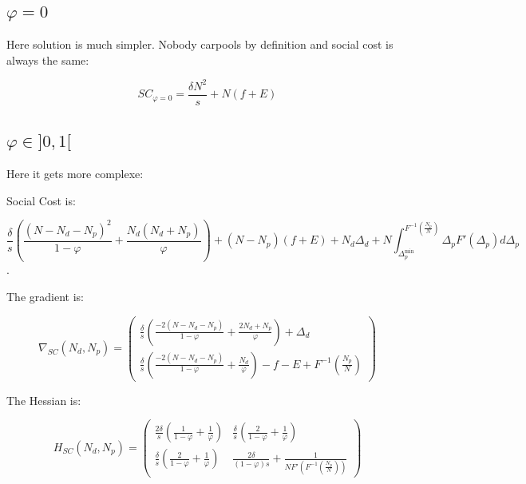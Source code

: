 \documentclass[english, a4paper]{article}
\theoremstyle{plain}
\theoremstyle{definition}
\theoremstyle{remark}
\begin{document}
    \subsection{$\varphi = 0$}

    Here solution is much simpler. Nobody carpools by definition and social cost is always the same:

    \begin{equation}
        SC_{\varphi = 0} = \frac{\delta N^2}{s} + N (f+E)
    \end{equation}

    \subsection{$\varphi \in ]0, 1[$}

    Here it gets more complexe:

    Social Cost is:

    \begin{equation}
        \frac{\delta}{s} \left ( \frac{(N - N_d - N_p)^2}{1- \varphi} + \frac{N_d(N_d + N_p)}{\varphi} \right)
        + (N - N_p) (f+E)
        + N_d \Delta_d + N \int_{\Delta_p^{\text{min}}}^{F^{-1} \left ( \frac{N_p}{N} \right)} \Delta_p F'(\Delta_p) d\Delta_p
    \end{equation}.

    The gradient is:

    \begin{equation}
        \nabla_{SC} (N_d, N_p) = \begin{pmatrix}
            \frac{\delta}{s} \left( \frac{-2(N - N_d - N_p)}{1 - \varphi} + \frac{2 N_d + N_p}{\varphi} \right) + \Delta_d\\
            \frac{\delta}{s} \left( \frac{-2(N - N_d - N_p)}{1 - \varphi} + \frac{N_d}{\varphi} \right) -f - E + F^{-1} \left( \frac{N_p}{N} \right)
        \end{pmatrix}
    \end{equation}

    The Hessian is:

    \begin{equation}
        H_{SC}(N_d, N_p) = \begin{pmatrix}
            \frac{2 \delta}{s} \left( \frac{1}{1 - \varphi} + \frac{1}{\varphi} \right) & \frac{\delta}{s} \left( \frac{2}{1 - \varphi} + \frac{1}{\varphi} \right)\\
            \frac{\delta}{s} \left( \frac{2}{1 - \varphi} + \frac{1}{\varphi} \right) & \frac{2\delta}{(1- \varphi )s} + \frac{1}{NF'\left(F^{-1}\left(\frac{N_p}{N} \right)\right)}
        \end{pmatrix}
    \end{equation}
\end{document}
